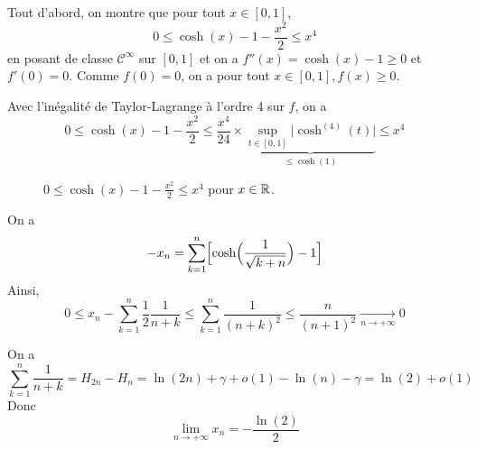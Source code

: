 \begin{solution}
	Tout d'abord, on montre que pour tout $x\in[0,1]$,
	$$0\leqslant\cosh(x)-1-\frac{x^{2}}{2}\leqslant x^{4}$$
	en posant 
	de classe $\mathcal{C}^{\infty}$ sur $[0,1]$ et on a $f''(x)=\cosh(x)-1\geqslant0$ et $f'(0)=0$. Comme $f(0)=0$, on a pour tout $x\in[0,1],f(x)\geqslant0$.

	Avec l'inégalité de Taylor-Lagrange à l'ordre 4 sur $f$, on a
	$$0\leqslant\cosh(x)-1-\frac{x^{2}}{2}\leqslant\frac{x^{4}}{24}\times\underbrace{\sup\limits_{t\in[0,1]}\vert\cosh^{(4)}(t)\vert}_{\leqslant\cosh(1)}\leqslant x^{4}$$

	\begin{figure}
		\centering
		\caption{$0\leqslant\cosh(x)-1-\frac{x^{2}}{2}\leqslant x^{4}$ pour $x\in\mathbb{R}$.}
	\end{figure}

	On a 
	$$-x_{n}=\sum_{k=1}^{n}\Bigl[\cosh\Bigl(\frac{1}{\sqrt{k+n}}\Bigr)-1\Bigr]$$
	Ainsi, 
	$$0\leqslant x_{n}-\sum_{k=1}^{n}\frac{1}{2}\frac{1}{n+k}\leqslant\sum_{k=1}^{n}\frac{1}{(n+k)^{2}}\leqslant\frac{n}{(n+1)^{2}}\xrightarrow[n\to+\infty]{}0$$

	On a 
	$$\sum_{k=1}^{n}\frac{1}{n+k}=H_{2n}-H_{n}=\ln(2n)+\gamma+o(1)-\ln(n)-\gamma=\ln(2)+o(1)$$
	Donc 
	$$\boxed{\lim\limits_{n\to+\infty}x_{n}=-\frac{\ln(2)}{2}}$$
\end{solution}

